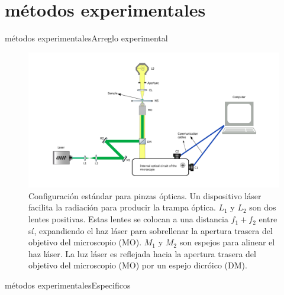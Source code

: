 \documentclass[10pt,aspectratio=1610,compress,dvipsnames]{beamer}
\begin{document}
\section{métodos experimentales}
\begin{frame}{métodos experimentales}{Arreglo experimental}

\begin{figure}
    \centering
    \includegraphics[scale=0.27]{Newplots_microfluidics_results/setup3.png}
    \caption{Configuración estándar para pinzas ópticas. Un dispositivo láser facilita la radiación para producir la trampa óptica. $L_1$ y $L_2$ son dos lentes positivas. Estas lentes se colocan a una distancia $f_1 + f_2$ entre sí, expandiendo el haz láser para sobrellenar la apertura trasera del objetivo del microscopio (MO). $M_1$ y $M_2$ son espejos para alinear el haz láser. La luz láser es reflejada hacia la apertura trasera del objetivo del microscopio (MO) por un espejo dicróico (DM).}
    \label{setuptweezers}
\end{figure}

\end{frame}


\begin{frame}{métodos experimentales}{Especificos}

\end{frame}
\end{document}
